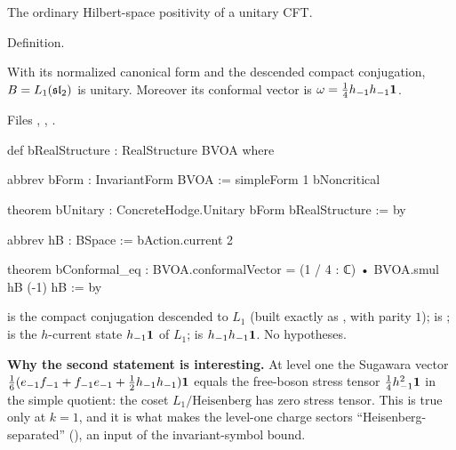 \begin{physics}
The ordinary Hilbert-space positivity of a unitary CFT.
\end{physics}

\begin{status}
Definition.
\end{status}

\begin{theorem}\label{l28:thm:bunitary}
With its normalized canonical form and the descended compact conjugation, $B=L_1(\mathfrak{sl}_2)$ is unitary. Moreover its conformal vector
is $\omega=\tfrac14 h_{-1}h_{-1}\mathbf 1$.
\end{theorem}

\noindent Files , ,
.
\begin{leancode}
def bRealStructure : RealStructure BVOA where

abbrev bForm : InvariantForm BVOA := simpleForm 1 bNoncritical

theorem bUnitary : ConcreteHodge.Unitary bForm bRealStructure := by

abbrev hB : BSpace := bAction.current 2

theorem bConformal_eq : BVOA.conformalVector = (1 / 4 : ℂ) • BVOA.smul hB (-1) hB := by
\end{leancode}

\begin{dictionary}
 is the compact conjugation descended to $L_1$ (built exactly as , with parity $1$);
 is ;  is the $h$-current state $h_{-1}\mathbf 1$ of $L_1$;  is
$h_{-1}h_{-1}\mathbf 1$. No hypotheses.

\textbf{Why the second statement is interesting.} At level one the Sugawara vector $\tfrac1{6}(e_{-1}f_{-1}+f_{-1}e_{-1}+\tfrac12h_{-1}h_{-1})\mathbf 1$
equals the free-boson stress tensor $\tfrac14h_{-1}^2\mathbf 1$ in the simple quotient: the coset $L_1/\text{Heisenberg}$ has zero stress
tensor. This is true only at $k=1$, and it is what makes the level-one charge sectors ``Heisenberg-separated''
(), an input of the invariant-symbol bound.
\end{dictionary}

